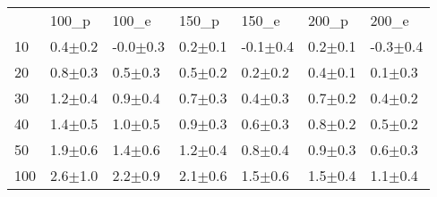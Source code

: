 \begin{tabular}{lllllll}
 & 100_p & 100_e & 150_p & 150_e & 200_p & 200_e \\
10 & {\cellcolor[HTML]{E1E1E1}} \color[HTML]{000000} 0.4$\pm$0.2 & {\cellcolor[HTML]{959595}} \color[HTML]{F1F1F1} -0.0$\pm$0.3 & {\cellcolor[HTML]{E0E0E0}} \color[HTML]{000000} 0.2$\pm$0.1 & {\cellcolor[HTML]{999999}} \color[HTML]{F1F1F1} -0.1$\pm$0.4 & {\cellcolor[HTML]{DEDEDE}} \color[HTML]{000000} 0.2$\pm$0.1 & {\cellcolor[HTML]{A8A8A8}} \color[HTML]{F1F1F1} -0.3$\pm$0.4 \\
20 & {\cellcolor[HTML]{E8E8E8}} \color[HTML]{000000} 0.8$\pm$0.3 & {\cellcolor[HTML]{C9C9C9}} \color[HTML]{000000} 0.5$\pm$0.3 & {\cellcolor[HTML]{E1E1E1}} \color[HTML]{000000} 0.5$\pm$0.2 & {\cellcolor[HTML]{A9A9A9}} \color[HTML]{F1F1F1} 0.2$\pm$0.2 & {\cellcolor[HTML]{F6F6F6}} \color[HTML]{000000} 0.4$\pm$0.1 & {\cellcolor[HTML]{9C9C9C}} \color[HTML]{F1F1F1} 0.1$\pm$0.3 \\
30 & {\cellcolor[HTML]{EAEAEA}} \color[HTML]{000000} 1.2$\pm$0.4 & {\cellcolor[HTML]{DADADA}} \color[HTML]{000000} 0.9$\pm$0.4 & {\cellcolor[HTML]{ECECEC}} \color[HTML]{000000} 0.7$\pm$0.3 & {\cellcolor[HTML]{C0C0C0}} \color[HTML]{000000} 0.4$\pm$0.3 & {\cellcolor[HTML]{FFFFFF}} \color[HTML]{000000} 0.7$\pm$0.2 & {\cellcolor[HTML]{C6C6C6}} \color[HTML]{000000} 0.4$\pm$0.2 \\
40 & {\cellcolor[HTML]{E7E7E7}} \color[HTML]{000000} 1.4$\pm$0.5 & {\cellcolor[HTML]{D7D7D7}} \color[HTML]{000000} 1.0$\pm$0.5 & {\cellcolor[HTML]{EEEEEE}} \color[HTML]{000000} 0.9$\pm$0.3 & {\cellcolor[HTML]{CBCBCB}} \color[HTML]{000000} 0.6$\pm$0.3 & {\cellcolor[HTML]{FFFFFF}} \color[HTML]{000000} 0.8$\pm$0.2 & {\cellcolor[HTML]{D7D7D7}} \color[HTML]{000000} 0.5$\pm$0.2 \\
50 & {\cellcolor[HTML]{EEEEEE}} \color[HTML]{000000} 1.9$\pm$0.6 & {\cellcolor[HTML]{E1E1E1}} \color[HTML]{000000} 1.4$\pm$0.6 & {\cellcolor[HTML]{EFEFEF}} \color[HTML]{000000} 1.2$\pm$0.4 & {\cellcolor[HTML]{D5D5D5}} \color[HTML]{000000} 0.8$\pm$0.4 & {\cellcolor[HTML]{F9F9F9}} \color[HTML]{000000} 0.9$\pm$0.3 & {\cellcolor[HTML]{D6D6D6}} \color[HTML]{000000} 0.6$\pm$0.3 \\
100 & {\cellcolor[HTML]{E8E8E8}} \color[HTML]{000000} 2.6$\pm$1.0 & {\cellcolor[HTML]{E2E2E2}} \color[HTML]{000000} 2.2$\pm$0.9 & {\cellcolor[HTML]{F7F7F7}} \color[HTML]{000000} 2.1$\pm$0.6 & {\cellcolor[HTML]{E6E6E6}} \color[HTML]{000000} 1.5$\pm$0.6 & {\cellcolor[HTML]{F9F9F9}} \color[HTML]{000000} 1.5$\pm$0.4 & {\cellcolor[HTML]{E4E4E4}} \color[HTML]{000000} 1.1$\pm$0.4 \\

\end{tabular}

